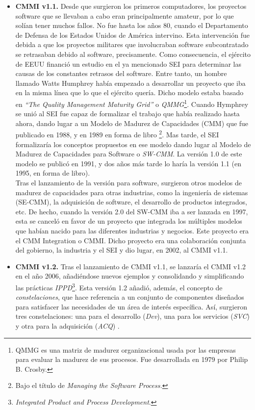 \begin{itemize}
    \item \textbf{CMMI v1.1.} Desde que surgieron los primeros computadores, los proyectos software que se llevaban a cabo eran principalmente amateur, por lo que solían tener muchos fallos. No fue hasta los años 80, cuando el Departamento de Defensa de los Estados Unidos de América intervino. Esta intervención fue debida a que los proyectos militares que involucraban software subcontratado se retrasaban debido al software, precisamente. Como consecuencia, el ejército de EEUU financió un estudio en el ya mencionado SEI para determinar las causas de los constantes retrasos del software. Entre tanto, un hombre llamado Watts Humphrey había empezado a desarrollar un proyecto que iba en la misma línea que lo que el ejército quería. Dicho modelo estaba basado en \textit{``The Quality Management Maturity Grid''} o \textit{QMMG}\footnote{QMMG es una matriz de madurez organizacional usada por las empresas para evaluar la madurez de sus procesos. Fue desarrollada en 1979 por Philip B. Crosby.}. Cuando Hymphrey se unió al SEI fue capaz de formalizar el trabajo que había realizado hasta ahora, dando lugar a un Modelo de Madurez de Capacidades (CMM) que fue publicado en 1988, y en 1989 en forma de libro \footnote{Bajo el título de \textit{Managing the Software Process.}}. Mas tarde, el SEI formalizaría los conceptos propuestos en ese modelo dando lugar al Modelo de Madurez de Capacidades para Software o \textit{SW-CMM}. La versión 1.0 de este modelo se publicó en 1991, y dos años más tarde lo haría la versión 1.1 (en 1995, en forma de libro).\\
    
    Tras el lanzamiento de la versión para software, surgieron otros modelos de madurez de capacidades para otras industrias, como la ingeniería de sistemas (SE-CMM), la adquisición de software, el desarrollo de productos integrados, etc. De hecho, cuando la versión 2.0 del SW-CMM iba a ser lanzada en 1997, esta se canceló en favor de un proyecto que integrada los múltiples modelos que habían nacido para las diferentes industrias y negocios. Este proyecto era el CMM Integration o CMMI. Dicho proyecto era una colaboración conjunta del gobierno, la industria y el SEI y dio lugar, en 2002, al CMMI v1.1. 
    
    \item \textbf{CMMI v1.2.} Tras el lanzamiento de CMMI v1.1, se lanzaría el CMMI v1.2 en el año 2006, añadiéndose nuevos ejemplos y consolidando y simplificando las prácticas \textit{IPPD}\footnote{\textit{Integrated Product and Process Development}.}. Esta versión 1.2 añadió, además, el concepto de \textit{constelaciones}, que hace referencia a un conjunto de componentes diseñados para satisfacer las necesidades de un área de interés específica. Así, surgieron tres constelaciones: una para el desarrollo (\textit{Dev}), una para los servicios (\textit{SVC}) y otra para la adquisición (\textit{ACQ}) \cite{cmmmiv12}.
    

\end{itemize}
